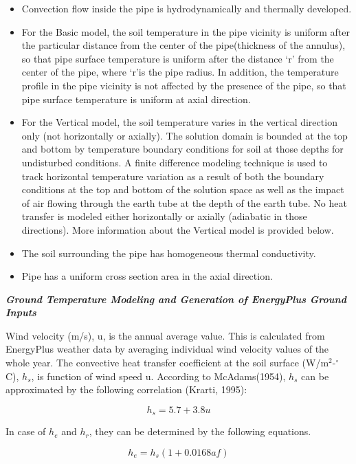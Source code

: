 \begin{itemize}
\item
  Convection flow inside the pipe is hydrodynamically and thermally developed.
\item
  For the Basic model, the soil temperature in the pipe vicinity is uniform after the particular distance from the center of the pipe(thickness of the annulus), so that pipe surface temperature is uniform after the distance `r' from the center of the pipe, where `r'is the pipe radius.  In addition, the temperature profile in the pipe vicinity is not affected by the presence of the pipe, so that pipe surface temperature is uniform at axial direction.
\item
  For the Vertical model, the soil temperature varies in the vertical direction only (not horizontally or axially). The solution domain is bounded at the top and bottom by temperature boundary conditions for soil at those depths for undisturbed conditions. A finite difference modeling technique is used to track horizontal temperature variation as a result of both the boundary conditions at the top and bottom of the solution space as well as the impact of air flowing through the earth tube at the depth of the earth tube.  No heat transfer is modeled either horizontally or axially (adiabatic in those directions).  More information about the Vertical model is provided below.
\item
  The soil surrounding the pipe has homogeneous thermal conductivity.
\item
  Pipe has a uniform cross section area in the axial direction.
\end{itemize}

\emph{\textbf{Ground Temperature Modeling and Generation of EnergyPlus Ground Inputs}}

Wind velocity (m/s), u, is the annual average value. This is calculated from EnergyPlus weather data by averaging individual wind velocity values of the whole year. The convective heat transfer coefficient at the soil surface (W/m\(^{2}\)-\(^{\circ}\)C), \(h_{s}\), is function of wind speed u. According to McAdams(1954), \(h_{s}\) can be approximated by the following correlation (Krarti, 1995):

\begin{equation}
{h_s} = 5.7 + 3.8u
\end{equation}

In case of \(h_{e}\) and \(h_{r}\), they can be determined by the following equations.

\begin{equation}
{h_e} = {h_s}\left( {1 + 0.0168af} \right)
\end{equation}

